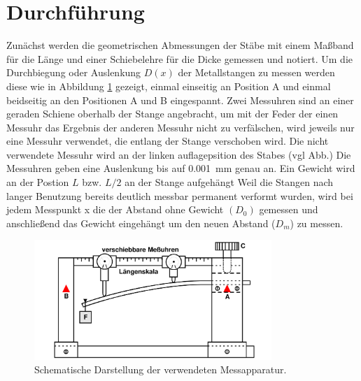 \section{Durchführung}
Zunächst werden die geometrischen Abmessungen der Stäbe mit einem Maßband für die Länge und einer Schiebelehre für die Dicke
gemessen und notiert.
Um die Durchbiegung oder Auslenkung $D(x)$ der Metallstangen zu messen werden diese wie in Abbildung \ref{fig:Messapparatur} gezeigt,
einmal einseitig an Position A und einmal beidseitig an den Positionen A und B eingespannt.
Zwei Messuhren sind an einer geraden Schiene oberhalb der Stange angebracht, um mit der Feder der einen Messuhr das Ergebnis der
anderen Messuhr nicht zu verfälschen, wird jeweils nur eine Messuhr verwendet, die entlang der Stange verschoben wird.
Die nicht verwendete Messuhr wird an der linken auflagepsition des Stabes (vgl Abb.)
Die Messuhren geben eine Auslenkung bis auf \qty{0.001}{\milli\meter} genau an.
Ein Gewicht wird an der Postion $L$ bzw. $L/2$ an der Stange aufgehängt
Weil die Stangen nach langer Benutzung bereits deutlich messbar permanent verformt wurden,
wird bei jedem Messpunkt x die der Abstand ohne Gewicht $(D_0)$ gemessen und anschließend das Gewicht eingehängt 
um den neuen Abstand ($D_m$) zu messen.

\begin{figure} 
    \centering
    \includegraphics[width=0.8\textwidth]{Abbildungen/Messapperatur.png}
    \caption{Schematische Darstellung der verwendeten Messapparatur.}
    \label{fig:Messapparatur}
\end{figure}